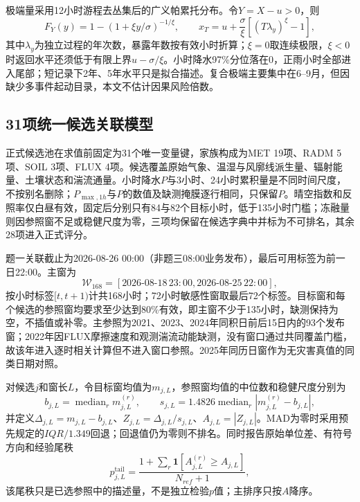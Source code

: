 极端量采用12小时游程去丛集后的广义帕累托分布。令$Y=X-u>0$，则
\begin{equation}
F_Y(y)=1-\left(1+\xi y/\sigma\right)^{-1/\xi},\qquad
x_T=u+\frac{\sigma}{\xi}\left[(T\lambda_y)^{\xi}-1\right],
\end{equation}
其中$\lambda_y$为独立过程的年次数，暴露年数按有效小时折算；$\xi=0$取连续极限，$\xi<0$时返回水平还须低于有限上界$u-\sigma/\xi$。小时降水97\%分位落在0，正雨小时全部进入尾部；短记录下2年、5年水平只是拟合描述。复合极端主要集中在6--9月，但因缺少多事件起动目录，本文不估计因果风险倍数。

\subsection{31项统一候选关联模型}
正式候选池在求值前固定为31个唯一变量键，家族构成为MET 19项、RADM 5项、SOIL 3项、FLUX 4项。候选覆盖原始气象、温湿与风廓线派生量、辐射能量、土壤状态和湍流通量。小时降水$P$与3小时、24小时累积量是不同时间尺度，不按别名删除；$P_{\max,1h}$与$P$的数值及缺测掩膜逐行相同，只保留$P$。晴空指数和反照率仅白昼有效，固定后分别只有84与82个目标小时，低于135小时门槛；冻融量则因参照窗不足或稳健尺度为零，三项均保留在候选字典中并标为不可排名，其余28项进入正式评分。

题一关联截止为2026-08-26 00:00（非题三08:00业务发布），最后可用标签为前一日22:00。主窗为
\begin{equation}
\mathcal W_{168}=[2026\text{-}08\text{-}18\,23{:}00,
2026\text{-}08\text{-}25\,22{:}00],
\end{equation}
按小时标签$[t,t+1)$计共168小时；72小时敏感性窗取最后72个标签。目标窗和每个候选的参照窗均要求至少达到80\%有效，即主窗不少于135小时，缺测保持为空，不插值或补零。主参照为2021、2023、2024年同积日前后15日内的93个发布窗；2022年因FLUX摩擦速度和观测湍流动能缺测，没有窗口通过共同覆盖门槛，故该年进入逐时相关计算但不进入窗口参照。2025年同历日窗作为无灾害真值的同类日期对照。

对候选$j$和窗长$L$，令目标窗均值为$m_{j,L}$，参照窗均值的中位数和稳健尺度分别为
\begin{equation}
b_{j,L}=\operatorname{median}_r m^{(r)}_{j,L},\qquad
s_{j,L}=1.4826\operatorname{median}_r
\left|m^{(r)}_{j,L}-b_{j,L}\right|,
\end{equation}
并定义$\Delta_{j,L}=m_{j,L}-b_{j,L}$、$Z_{j,L}=\Delta_{j,L}/s_{j,L}$、$A_{j,L}=|Z_{j,L}|$。MAD为零时采用预先规定的$IQR/1.349$回退；回退值仍为零则不排名。同时报告原始单位差、有符号方向和经验尾秩
\begin{equation}
p^{\mathrm{tail}}_{j,L}=
\frac{1+\sum_r\mathbf 1[A^{(r)}_{j,L}\ge A_{j,L}]}{N_{ref}+1},
\end{equation}
该尾秩只是已选参照中的描述量，不是独立检验$p$值；主排序只按$A$降序。

